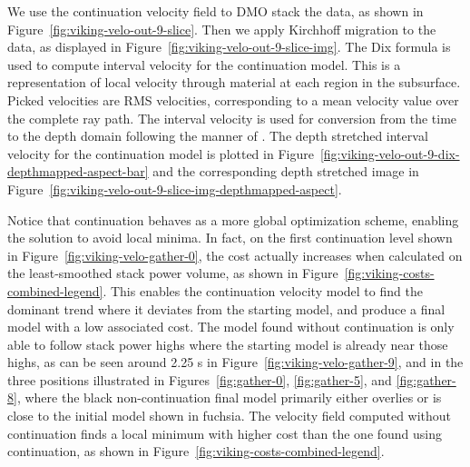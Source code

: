 
We use the continuation velocity field to DMO stack the data, as shown in Figure~\ref{fig:viking-velo-out-9-slice}. Then we apply Kirchhoff migration to the data, as displayed in Figure~\ref{fig:viking-velo-out-9-slice-img}.
The Dix formula \cite[]{dixvelocity} is used to compute interval velocity for the continuation model.  This is a representation of local velocity through material at each region in the subsurface.  Picked velocities are RMS velocities, corresponding to a mean velocity value over the complete ray path.  The interval velocity is used for conversion from the time to the depth domain  following the manner of \cite{zone-2018}.  The depth stretched interval velocity for the continuation model is plotted in Figure~\ref{fig:viking-velo-out-9-dix-depthmapped-aspect-bar} and the corresponding depth stretched image in Figure~\ref{fig:viking-velo-out-9-slice-img-depthmapped-aspect}.


Notice that continuation behaves as a more global optimization scheme, enabling the solution to avoid local minima.  In fact, on the first continuation level shown in Figure~\ref{fig:viking-velo-gather-0}, the cost actually increases when calculated on the least-smoothed stack power volume, as shown in Figure~\ref{fig:viking-costs-combined-legend}.  This enables the continuation velocity model to find the dominant trend  where it deviates from the starting model, and produce a final model with a low associated cost. The model found without continuation is only able to follow stack power highs where the starting model is already near those highs, as can be seen around 2.25 s in Figure~\ref{fig:viking-velo-gather-9}, and in the three positions illustrated in Figures~\ref{fig:gather-0}, \ref{fig:gather-5}, and \ref{fig:gather-8}, where the black non-continuation final model primarily either overlies or is close to the initial model shown in fuchsia. The velocity field computed without continuation  finds a local minimum with higher cost than the one found using continuation, as shown in Figure~\ref{fig:viking-costs-combined-legend}.   

